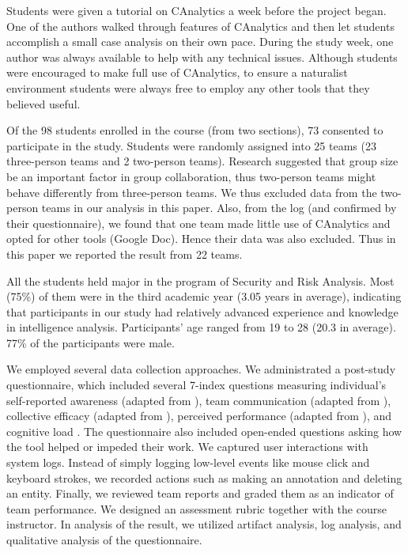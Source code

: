 Students were given a tutorial on CAnalytics a week before the project
began. One of the authors walked through features of CAnalytics and then
let students accomplish a small case analysis on their own pace. During
the study week, one author was always available to help with any
technical issues. Although students were encouraged to make full use of
CAnalytics, to ensure a naturalist environment students were always free
to employ any other tools that they believed useful.

Of the 98 students enrolled in the course (from two sections), 73
consented to participate in the study. Students were randomly assigned
into 25 teams (23 three-person teams and 2 two-person teams). Research
suggested that group size be an important factor in group collaboration,
thus two-person teams might behave differently from three-person teams.
We thus excluded data from the two-person teams in our analysis in this
paper. Also, from the log (and confirmed by their questionnaire), we
found that one team made little use of CAnalytics and opted for other
tools (Google Doc). Hence their data was also excluded. Thus in this
paper we reported the result from 22 teams.

All the students held major in the program of Security and Risk
Analysis. Most (75\%) of them were in the third academic year (3.05
years in average), indicating that participants in our study had
relatively advanced experience and knowledge in intelligence analysis.
Participants' age ranged from 19 to 28 (20.3 in average). 77\% of the
participants were male.

We employed several data collection approaches. We administrated a
post-study questionnaire, which included several 7-index questions
measuring individual's self-reported awareness (adapted from
\autocite{Convertino2011}), team communication (adapted from
\autocite{Convertino2011}), collective efficacy (adapted from
\autocite{Convertino2011}), perceived performance (adapted from
\autocite{Goyal2014}), and cognitive load \autocite{Hart1988}. The
questionnaire also included open-ended questions asking how the tool
helped or impeded their work. We captured user interactions with system
logs. Instead of simply logging low-level events like mouse click and
keyboard strokes, we recorded actions such as making an annotation and
deleting an entity. Finally, we reviewed team reports and graded them as
an indicator of team performance. We designed an assessment rubric
together with the course instructor. In analysis of the result, we
utilized artifact analysis, log analysis, and qualitative analysis of
the questionnaire.


